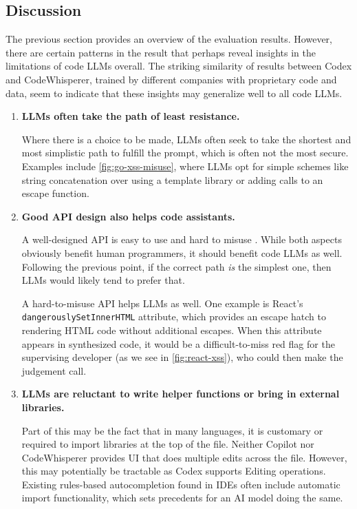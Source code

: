 \documentclass[sigplan,screen,nonacm]{acmart}
\begin{document}
\subsection{Discussion}

The previous section provides an overview of the evaluation results. However, there are certain patterns in the result that perhaps reveal insights in the limitations of code LLMs overall. The striking similarity of results between Codex and Code\-Whis\-per\-er, trained by different companies with proprietary code and data, seem to indicate that these insights may generalize well to all code LLMs.
\begin{enumerate}
    \item \textbf{LLMs often take the path of least resistance.} %
    
        Where there is a choice to be made, LLMs often seek to take the shortest and most simplistic path to fulfill the prompt, which is often not the most secure. Examples include \cref{fig:go-xss-misuse}, where LLMs opt for simple schemes like string concatenation over using a template library or adding calls to an escape function.

    \item \textbf{Good API design also helps code assistants.}

        A well-designed API is easy to use and hard to misuse \cite{java-crypto-bad}. While both aspects obviously benefit human programmers, it should benefit code LLMs as well. Following the previous point, if the correct path \emph{is} the simplest one, then LLMs would likely tend to prefer that.

        A hard-to-misuse API helps LLMs as well. One example is React's \texttt{dan\-ger\-ous\-ly\-Set\-In\-ner\-HTML} attrib\-ute, which provides an escape hatch to rendering HTML code without additional escapes. When this attribute appears in synthesized code, it would be a difficult-to-miss red flag for the supervising developer (as we see in \cref{fig:react-xss}), who could then make the judgement call.

    \item \textbf{LLMs are reluctant to write helper functions or bring in external libraries.}

        Part of this may be the fact that in many languages, it is customary or required to import libraries at the top of the file. Neither Copilot nor Code\-Whis\-per\-er provides UI that does multiple edits across the file. However, this may potentially be tractable as Codex supports Editing operations. Existing rules-based autocompletion found in IDEs often include automatic import functionality, which sets precedents for an AI model doing the same.


\end{enumerate}
\end{document}
